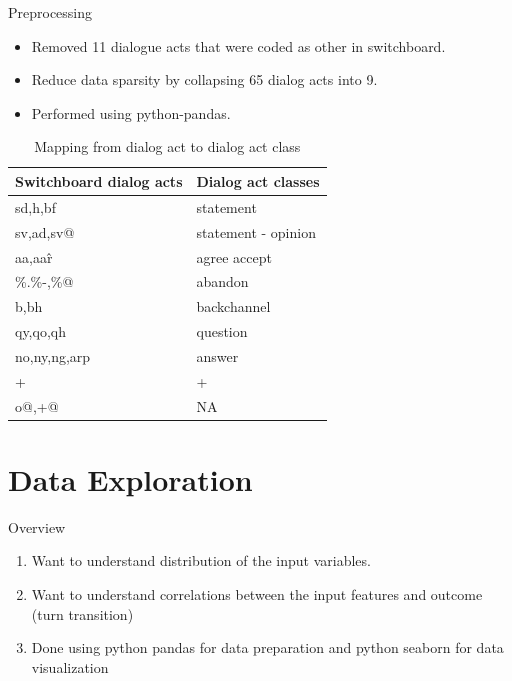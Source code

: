 \begin{frame}{Preprocessing}
 \begin{itemize}
    \item Removed 11 dialogue acts that were coded as other in switchboard.
    \item Reduce data sparsity by collapsing 65 dialog acts into 9.
    \item Performed using python-pandas.
  \end{itemize}

  \begin{table}
     \begin{center}
     \begin{tabular}{l | l}
    \hline
Switchboard dialog acts &  Dialog act classes  \\
    \hline
sd,h,bf      & statement   \\
sv,ad,sv@    & statement - opinion  \\
aa,aa\^r     & agree accept \\
\%.\%-,\%@   & abandon      \\
b,bh         & backchannel  \\
qy,qo,qh     & question     \\
no,ny,ng,arp & answer       \\
+            & +            \\
o@,+@        & NA           \\
  \hline
\end{tabular}
\end{center}\vspace{-0.5em}
\caption{Mapping from dialog act to dialog act class}
\label{tab:mapping}
\end{table}

\end{frame}{}


\section{Data Exploration}
\frame{\sectionpage}

\begin{frame}{Overview}
     \begin{enumerate}[<+->]\itemsep9pt
          \item Want to understand distribution of the input variables.
          \item Want to understand correlations between the input features and outcome (turn transition)
          \item Done using python pandas for data preparation and python seaborn for data visualization
      \end{enumerate}
\end{frame}


